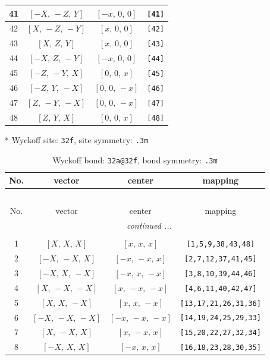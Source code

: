 \documentclass[fleqn,8pt]{jsarticle}
\begin{document}
\begin{longtable}{cccc}
41 & $\left[ - X,\, - Z,\, Y \right]$ & $\left[ - x,\, 0,\, 0 \right]$ & {\tt [41]} \\ \hline
42 & $\left[ X,\, - Z,\, - Y \right]$ & $\left[ x,\, 0,\, 0 \right]$ & {\tt [42]} \\ \hline
43 & $\left[ X,\, Z,\, Y \right]$ & $\left[ x,\, 0,\, 0 \right]$ & {\tt [43]} \\ \hline
44 & $\left[ - X,\, Z,\, - Y \right]$ & $\left[ - x,\, 0,\, 0 \right]$ & {\tt [44]} \\ \hline
45 & $\left[ - Z,\, - Y,\, X \right]$ & $\left[ 0,\, 0,\, x \right]$ & {\tt [45]} \\ \hline
46 & $\left[ - Z,\, Y,\, - X \right]$ & $\left[ 0,\, 0,\, - x \right]$ & {\tt [46]} \\ \hline
47 & $\left[ Z,\, - Y,\, - X \right]$ & $\left[ 0,\, 0,\, - x \right]$ & {\tt [47]} \\ \hline
48 & $\left[ Z,\, Y,\, X \right]$ & $\left[ 0,\, 0,\, x \right]$ & {\tt [48]} \\
\end{longtable}
* Wyckoff site: {\tt 32f}, site symmetry: {\tt .3m}
\renewcommand{\arraystretch}{1.2}
\begin{longtable}{cccc}
\caption{Wyckoff bond: {\tt 32a@32f}, bond symmetry: {\tt .3m}}
 \\
 \hline \hline
No. & vector & center & mapping \\ \hline \endfirsthead

\multicolumn{3}{l}{\tablename\ \thetable{}} \\
 \hline \hline
No. & vector & center & mapping \\ \hline \endhead

 \hline \hline
\multicolumn{3}{r}{\footnotesize\it continued ...} \\ \endfoot

 \hline \hline
\multicolumn{3}{r}{} \\ \endlastfoot

1 & $\left[ X,\, X,\, X \right]$ & $\left[ x,\, x,\, x \right]$ & {\tt [1,5,9,38,43,48]} \\ \hline
2 & $\left[ - X,\, - X,\, X \right]$ & $\left[ - x,\, - x,\, x \right]$ & {\tt [2,7,12,37,41,45]} \\ \hline
3 & $\left[ - X,\, X,\, - X \right]$ & $\left[ - x,\, x,\, - x \right]$ & {\tt [3,8,10,39,44,46]} \\ \hline
4 & $\left[ X,\, - X,\, - X \right]$ & $\left[ x,\, - x,\, - x \right]$ & {\tt [4,6,11,40,42,47]} \\ \hline
5 & $\left[ X,\, X,\, - X \right]$ & $\left[ x,\, x,\, - x \right]$ & {\tt [13,17,21,26,31,36]} \\ \hline
6 & $\left[ - X,\, - X,\, - X \right]$ & $\left[ - x,\, - x,\, - x \right]$ & {\tt [14,19,24,25,29,33]} \\ \hline
7 & $\left[ X,\, - X,\, X \right]$ & $\left[ x,\, - x,\, x \right]$ & {\tt [15,20,22,27,32,34]} \\ \hline
8 & $\left[ - X,\, X,\, X \right]$ & $\left[ - x,\, x,\, x \right]$ & {\tt [16,18,23,28,30,35]} \\
\end{longtable}
\end{document}
